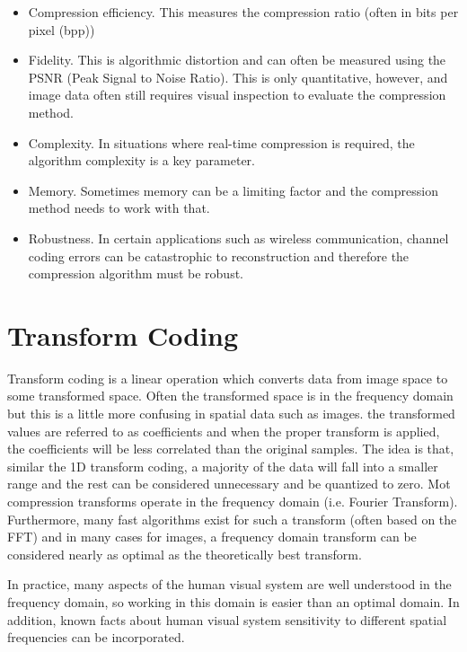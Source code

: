 \documentclass[11pt,a4paper]{article}
\begin{document}
\begin{itemize}
\item Compression efficiency. This measures the compression ratio (often in bits per pixel (bpp))
\item Fidelity. This is algorithmic distortion and can often be measured using the PSNR (Peak Signal to Noise Ratio). This is only quantitative, however, and image data often still requires visual inspection to evaluate the compression method.
\item Complexity. In situations where real-time compression is required, the algorithm complexity is a key parameter.
\item Memory. Sometimes memory can be a limiting factor and the compression method needs to work with that.
\item Robustness. In certain applications such as wireless communication, channel coding errors can be catastrophic to reconstruction and therefore the compression algorithm must be robust.
\end{itemize}

\pagebreak

\section{Transform Coding}
Transform coding is a linear operation which converts data from image space to some transformed space. Often the transformed space is in the frequency domain but this is a little more confusing in spatial data such as images. the transformed values are referred to as coefficients and when the proper transform is applied, the coefficients will be less correlated than the original samples. The idea is that, similar the 1D transform coding, a majority of the data will fall into a smaller range and the rest can be considered unnecessary and be quantized to zero. Mot compression transforms operate in the frequency domain (i.e. Fourier Transform). Furthermore, many fast algorithms exist for such a transform (often based on the FFT) and in many cases for images, a frequency domain transform can be considered nearly as optimal as the theoretically best transform.

In practice, many aspects of the human visual system are well understood in the frequency domain, so working in this domain is easier than an optimal domain. In addition, known facts about human visual system sensitivity to different spatial frequencies can be incorporated.
\end{document}
